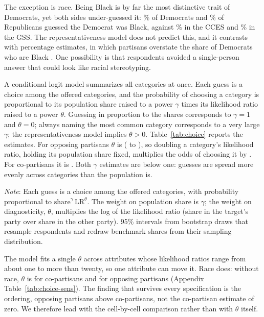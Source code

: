 \documentclass[11pt]{article}
\newcommand{\TableStyle}{\small\setlength{\tabcolsep}{5pt}\renewcommand{\arraystretch}{1.05}}
\begin{document}
The exception is race. Being Black is by far the most distinctive trait of Democrats, yet both sides under-guessed it: \blackIn\% of Democrats and \blackOut\% of Republicans guessed the Democrat was Black, against \blackTruth\% in the CCES and \blackGss\% in the GSS. The representativeness model does not predict this, and it contrasts with percentage estimates, in which partisans overstate the share of Democrats who are Black \citep{ahler2018parties}. One possibility is that respondents avoided a single-person answer that could look like racial stereotyping.

A conditional logit model summarizes all categories at once. Each guess is a choice among the offered categories, and the probability of choosing a category is proportional to its population share raised to a power $\gamma$ times its likelihood ratio raised to a power $\theta$. Guessing in proportion to the shares corresponds to $\gamma=1$ and $\theta=0$; always naming the most common category corresponds to a very large $\gamma$; the representativeness model implies $\theta>0$. Table~\ref{tab:choice} reports the estimates. For opposing partisans $\theta$ is \thetaOut{} (\thetaOutLo{} to \thetaOutHi), so doubling a category's likelihood ratio, holding its population share fixed, multiplies the odds of choosing it by \thetaOutDouble. For co-partisans it is \thetaIn. Both $\gamma$ estimates are below one: guesses are spread more evenly across categories than the population is.

\begin{table}[htbp]
\centering\TableStyle
\caption{Conditional logit estimates of how guesses respond to a category's population share and its likelihood ratio.}
\label{tab:choice}
\begin{minipage}{\linewidth}\footnotesize\vspace{4pt}
\emph{Note}: Each guess is a choice among the offered categories, with probability proportional to $\text{share}^{\gamma}\,\text{LR}^{\theta}$. The weight on population share is $\gamma$; the weight on diagnosticity, $\theta$, multiplies the log of the likelihood ratio (share in the target's party over share in the other party). 95\% intervals from \bootReps{} bootstrap draws that resample respondents and redraw benchmark shares from their sampling distribution.
\end{minipage}
\end{table}

The model fits a single $\theta$ across attributes whose likelihood ratios range from about one to more than twenty, so one attribute can move it. Race does: without race, $\theta$ is \thetaInNoRace{} for co-partisans and \thetaOutNoRace{} for opposing partisans (Appendix Table~\ref{tab:choice-sens}). The finding that survives every specification is the ordering, opposing partisans above co-partisans, not the co-partisan estimate of zero. We therefore lead with the cell-by-cell comparison rather than with $\theta$ itself.
\end{document}
